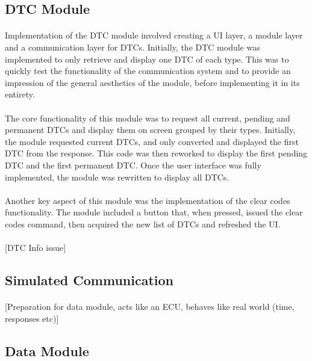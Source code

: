 	\subsection{DTC Module}
		\paragraph{}{
		Implementation of the DTC module involved creating a UI layer, a module layer and a communication layer for DTCs.	Initially, the DTC module was implemented to only retrieve and display one DTC of each type. This was to quickly test the functionality of the communication system and to provide an impression of the general aesthetics of the module, before implementing it in its entirety.
		}		
		\paragraph{}{
		The core functionality of this module was to request all current, pending and permanent DTCs and display them on screen grouped by their types. Initially, the module requested current DTCs, and only converted and displayed the first DTC from the response. This code was then reworked to display the first pending DTC and the first permanent DTC. Once the user interface was fully implemented, the module was rewritten to display all DTCs.
		}
		\paragraph{}{
		Another key aspect of this module was the implementation of the clear codes functionality. The module included a button that, when pressed, issued the clear codes command, then acquired the new list of DTCs and refreshed the UI.
		}
		\paragraph{}{
		[DTC Info issue]
		}
		
	\subsection{Simulated Communication}
		\paragraph{}{
		[Preparation for data module, acts like an ECU, behaves like real world (time, responses etc)]
		}	

	\subsection{Data Module}
